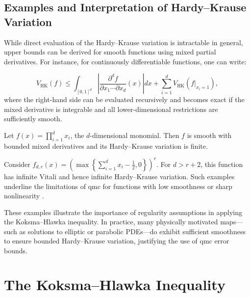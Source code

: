 \subsection{Examples and Interpretation of Hardy--Krause Variation}
\label{sec:hk-examples}

While direct evaluation of the Hardy--Krause variation is intractable in
general, upper bounds can be derived for smooth functions using mixed partial
derivatives. For instance, for continuously differentiable functions, one can
write:

\begin{equation*}
    V_{\mathrm{HK}}(f) \leq \int_{[0,1]^d} \left| \frac{\partial^d f}{\partial x_1 \cdots \partial x_d}(x) \right| dx + \sum_{i=1}^d V_{\mathrm{HK}}(f|_{x_i = 1}),
\end{equation*}
where the right-hand side can be evaluated recursively and becomes exact if the
mixed derivative is integrable and all lower-dimensional restrictions are
sufficiently smooth.

\begin{example}
Let $f(x) = \prod_{i=1}^d x_i$, the $d$-dimensional monomial. Then $f$ is smooth
with bounded mixed derivatives and its Hardy--Krause variation is finite.
\end{example}

\begin{example}
Consider $f_{d,r}(x) = \left( \max\left\{ \sum_{i=1}^d x_i - \frac{1}{2}, 0
\right\} \right)^r$. For $d > r + 2$, this function has infinite Vitali and
hence infinite Hardy--Krause variation. Such examples underline the limitations
of \ac{qmc} for functions with low smoothness or sharp nonlinearity \cite[Prop.
16]{owen2005multidimensional}.
\end{example}

These examples illustrate the importance of regularity assumptions in applying
the Koksma--Hlawka inequality. In practice, many physically motivated maps—such
as solutions to elliptic or parabolic PDEs—do exhibit sufficient smoothness to
ensure bounded Hardy--Krause variation, justifying the use of \ac{qmc} error
bounds.

\section{The Koksma--Hlawka Inequality}

